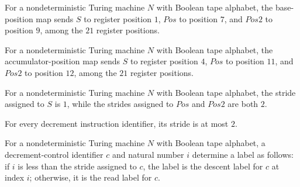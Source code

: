 \begin{definition}
\label{Complexity.Codec.dcBase}
\leanok
{}
For a nondeterministic Turing machine $N$ with Boolean tape alphabet, the base-position
map sends $S$ to register position $1$, $Pos$ to position $7$, and $Pos2$ to position
$9$, among the $21$ register positions.
\end{definition}

\begin{definition}
\label{Complexity.Codec.dcAcc}
\leanok
{}
For a nondeterministic Turing machine $N$ with Boolean tape alphabet, the
accumulator-position map sends $S$ to register position $4$, $Pos$ to position $11$, and
$Pos2$ to position $12$, among the $21$ register positions.
\end{definition}

\begin{definition}
\label{Complexity.Codec.dcStride}
\leanok
{}
For a nondeterministic Turing machine $N$ with Boolean tape alphabet, the stride
assigned to $S$ is $1$, while the strides assigned to $Pos$ and $Pos2$ are both $2$.
\end{definition}

\begin{lemma}
\label{Complexity.Codec.dcStride_le}
\leanok
{}
For every decrement instruction identifier, its stride is at most $2$.
\end{lemma}

\begin{definition}
\label{Complexity.Codec.dcDowns}
\leanok
{}
For a nondeterministic Turing machine $N$ with Boolean tape alphabet, a
decrement-control identifier $c$ and natural number $i$ determine a label as follows: if
$i$ is less than the stride assigned to $c$, the label is the descent label for $c$ at
index $i$; otherwise, it is the read label for $c$.
\end{definition}

